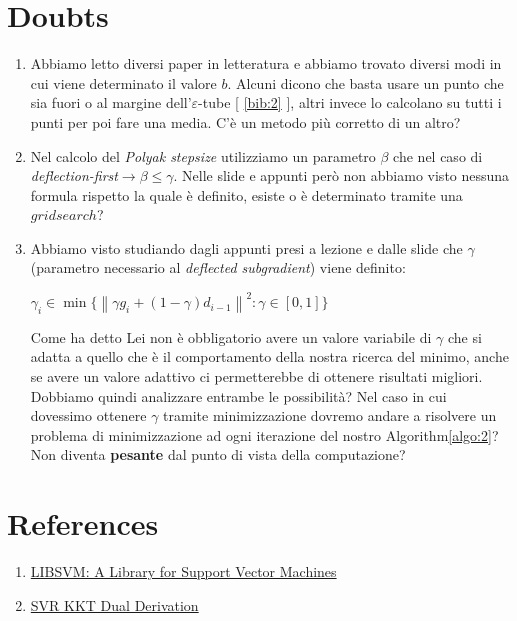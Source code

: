 \documentclass[12pt]{article}
\newcommand{\norm}[1]{\left\lVert#1\right\rVert}
\begin{document}
	\section{Doubts}
	\begin{enumerate}
		\item Abbiamo letto diversi paper in letteratura e abbiamo trovato diversi modi in cui viene determinato il valore $b$. Alcuni dicono che basta usare un punto che sia fuori o al margine dell’$\varepsilon$-tube {[ \ref{bib:2} ]}, altri invece lo calcolano su tutti i punti per poi fare una media. C’è un metodo più corretto di un altro? 
		\item Nel calcolo del \textit{Polyak stepsize} utilizziamo un parametro $\beta$ che nel caso di \textit{deflection-first}$ \longrightarrow \beta \leq \gamma$. Nelle slide e appunti però non abbiamo visto nessuna formula rispetto la quale è definito, esiste o è determinato tramite una $grid search$?
		\item Abbiamo visto studiando dagli appunti presi a lezione e dalle slide che $\gamma$ (parametro necessario al \textit{deflected subgradient}) viene definito:\begin{center} $ \gamma_i \in \min\{\norm{\gamma g_i + (1-\gamma)d_{i-1}}^2 : \gamma \in [0,1]\}$\end{center}
		Come ha detto Lei non è obbligatorio avere un valore variabile di $\gamma$ che si adatta a quello che è il comportamento della nostra ricerca del minimo, anche se avere un valore adattivo ci permetterebbe di ottenere risultati migliori. Dobbiamo quindi analizzare entrambe le possibilità? Nel caso in cui dovessimo ottenere $\gamma$ tramite minimizzazione dovremo andare a risolvere un problema di minimizzazione ad ogni iterazione del nostro Algorithm\ref{algo:2}? Non diventa \textbf{pesante} dal punto di vista della computazione?
	\end{enumerate}

	\section{References}
	\begin{enumerate}
		\item \href{https://www.csie.ntu.edu.tw/~cjlin/papers/libsvm.pdf}{LIBSVM: A Library for Support Vector Machines } \label{bib:1}
		\item \href{https://www.cse.iitb.ac.in/~cs709/notes/enotes/svr-kkt-dual-derivation.pdf}{SVR KKT Dual Derivation } \label{bib:2}
	\end{enumerate}
\end{document}
